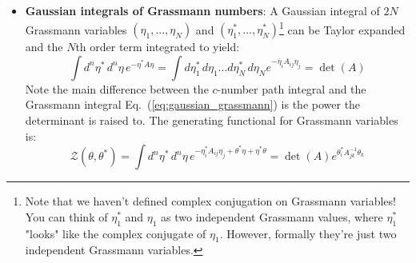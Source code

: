 \documentclass[12pt, oneside]{article}   	%
\theoremstyle{definition}
\begin{document}
\begin{itemize}
	\item \textbf{Gaussian integrals of Grassmann numbers}: A Gaussian integral of $2N$ Grassmann variables $(\eta_1, ..., \eta_N)$ and $(\eta_1^*, ..., \eta_N^*)$\footnote{Note that we haven't defined complex conjugation on Grassmann variables! You can think of $\eta_1^*$ and $\eta_1$ as two independent Grassmann values, where $\eta_1^*$ "looks" like the complex conjugate of $\eta_1$. However, formally they're just two independent Grassmann variables.} can be Taylor expanded and the $N$th order term integrated to yield:
	\begin{equation}
	\int d^n\eta^* \, d^n\eta \, e^{-\eta^* A \eta} = \int d\eta_1^*\,d\eta_1 ... d\eta_N^*\,d\eta_N e^{-\overline\eta_i A_{ij} \eta_j} = \det(A)
	\label{eq:gaussian_grassmann}
	\end{equation}
	Note the main difference between the $c$-number path integral and the Grassmann integral Eq.~(\ref{eq:gaussian_grassmann}) is the power the determinant is raised to. The generating functional for Grassmann variables is:
	\begin{equation}
		\mathcal Z(\theta, \theta^*) = \int d^n\eta^*\, d^n\eta\, e^{-\eta_i^* A_{ij}\eta_j + \theta^* \eta + \eta^* \theta} = \det(A) e^{\theta_i^* A^{-1}_{jk} \theta_k}
	\end{equation}
	

\end{itemize}
\end{document}
